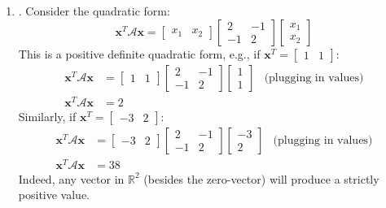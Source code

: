 \documentclass[12pt]{article}
\begin{document}
\begin{enumerate}
\begin{enumerate}
	\item\underline{}.
	Consider the quadratic form:
	\[\mathbf{x}^T \mathcal{A}\mathbf{x}=\begin{bmatrix}x_1&x_2\end{bmatrix}
	\begin{bmatrix}2&-1\\-1&2\end{bmatrix}
	\begin{bmatrix}x_1\\x_2\end{bmatrix}\]
	This is a positive definite quadratic form, e.g., if $\mathbf{x}^T=\begin{bmatrix}1 & 1\end{bmatrix}$:
	\begin{align*}
	\mathbf{x}^T \mathcal{A}\mathbf{x} & = \begin{bmatrix}1&1\end{bmatrix}\begin{bmatrix}2&-1\\-1&2\end{bmatrix}\begin{bmatrix}1\\1\end{bmatrix}
	&\text{(plugging in values)}\\
	\mathbf{x}^T \mathcal{A}\mathbf{x} & = 2
	\end{align*}
	Similarly, if $\mathbf{x}^T=\begin{bmatrix}-3&2\end{bmatrix}$:
	\begin{align*}
	\mathbf{x}^T \mathcal{A}\mathbf{x} & = \begin{bmatrix}-3&2\end{bmatrix}\begin{bmatrix}2&-1\\-1&2\end{bmatrix}\begin{bmatrix}-3\\2\end{bmatrix}
	&\text{(plugging in values)}\\
	\mathbf{x}^T \mathcal{A}\mathbf{x} & = 38
	\end{align*}
	Indeed, any vector in $\mathbb{R}^2$ (besides the zero-vector) will produce a strictly positive value.
	

\end{enumerate}
\end{enumerate}
\end{document}
